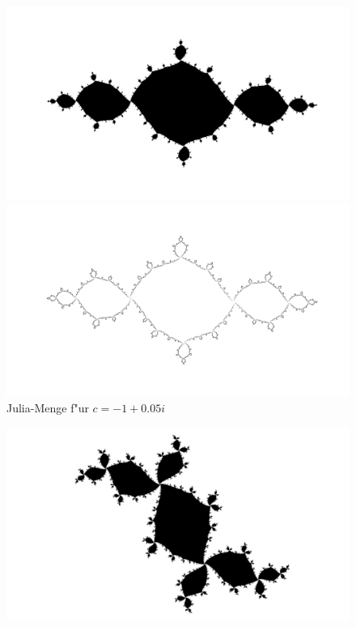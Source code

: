 \begin{refsection}
\begin{figure}
\begin{center}
\includegraphics[width=\hsize]{julia/c.png}

\bigskip

\includegraphics[width=\hsize]{julia/j-c.png}
\end{center}
\caption{Julia-Menge f"ur $c= -1+0.05i$}
\end{figure}

\begin{figure}
\begin{center}
\includegraphics[width=\hsize]{julia/d.png}


\end{center}
\end{figure}
\end{refsection}
